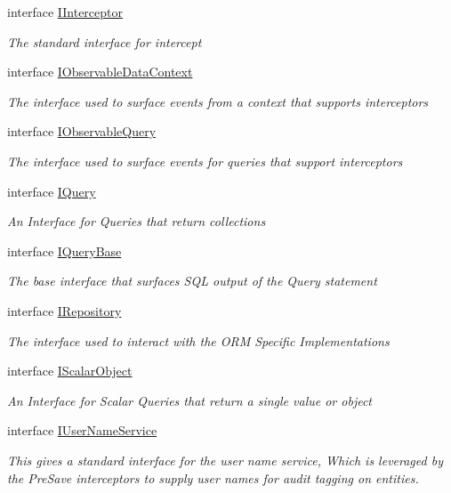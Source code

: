 \begin{DoxyCompactItemize}
interface \hyperlink{interface_highway_1_1_data_1_1_interfaces_1_1_i_interceptor-g}{I\-Interceptor}
\begin{DoxyCompactList}\small\item\em The standard interface for intercept \end{DoxyCompactList}\item 
interface \hyperlink{interface_highway_1_1_data_1_1_interfaces_1_1_i_observable_data_context}{I\-Observable\-Data\-Context}
\begin{DoxyCompactList}\small\item\em The interface used to surface events from a context that supports interceptors \end{DoxyCompactList}\item 
interface \hyperlink{interface_highway_1_1_data_1_1_interfaces_1_1_i_observable_query}{I\-Observable\-Query}
\begin{DoxyCompactList}\small\item\em The interface used to surface events for queries that support interceptors \end{DoxyCompactList}\item 
interface \hyperlink{interface_highway_1_1_data_1_1_interfaces_1_1_i_query-g}{I\-Query}
\begin{DoxyCompactList}\small\item\em An Interface for Queries that return collections \end{DoxyCompactList}\item 
interface \hyperlink{interface_highway_1_1_data_1_1_interfaces_1_1_i_query_base}{I\-Query\-Base}
\begin{DoxyCompactList}\small\item\em The base interface that surfaces S\-Q\-L output of the Query statement \end{DoxyCompactList}\item 
interface \hyperlink{interface_highway_1_1_data_1_1_interfaces_1_1_i_repository}{I\-Repository}
\begin{DoxyCompactList}\small\item\em The interface used to interact with the O\-R\-M Specific Implementations \end{DoxyCompactList}\item 
interface \hyperlink{interface_highway_1_1_data_1_1_interfaces_1_1_i_scalar_object-g}{I\-Scalar\-Object}
\begin{DoxyCompactList}\small\item\em An Interface for Scalar Queries that return a single value or object \end{DoxyCompactList}\item 
interface \hyperlink{interface_highway_1_1_data_1_1_interfaces_1_1_i_user_name_service}{I\-User\-Name\-Service}
\begin{DoxyCompactList}\small\item\em This gives a standard interface for the user name service, Which is leveraged by the Pre\-Save interceptors to supply user names for audit tagging on entities. \end{DoxyCompactList}\end{DoxyCompactItemize}
